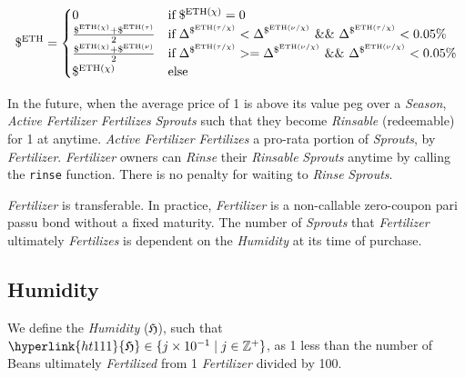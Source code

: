 \documentclass[tikz]{article}
\newcommand{\code}[1]{\texttt{#1}}
\newcommand{\term}[1]{\textsl{#1}}
\newcommand{\Bean}{} %
\begin{document}
    $$ 
        \$^{\text{ETH}} =
        \begin{cases}
            {0} 
                & \text{if} \; \$^{\text{ETH}(\chi)} = 0  \\
            
            {\frac{\$^{\text{ETH}(\chi)} + \$^{\text{ETH}(\tau)}}
                    {2}} 
                & \text{if} \; 
                    \Delta^{\$^{\text{ETH}(\tau \slash \chi)}} < \Delta^{\$^{\text{ETH}(\nu \slash \chi)}} \mkern6mu \&\& 
                    \mkern6mu \Delta^{\$^{\text{ETH}(\tau \slash \chi)}} < 0.05\% \\
            
            {\frac{\$^{\text{ETH}(\chi)} + \$^{\text{ETH}(\nu)}}
                    {2}} 
                & \text{if} \; 
                    \Delta^{\$^{\text{ETH}(\tau \slash \chi)}} >= \Delta^{\$^{\text{ETH}(\nu \slash \chi)}} \mkern6mu \&\& 
                    \mkern6mu \Delta^{\$^{\text{ETH}(\nu \slash \chi)}} < 0.05\% \\
            
            {\$^{\text{ETH}(\chi)}} 
                & \text{else}
        \end{cases} 
    $$

In the future, when the average price of \Bean1 is above its value peg over a \term{Season}, \term{Active} \term{Fertilizer} \term{Fertilizes} \term{Sprouts} such that they become \term{Rinsable} (redeemable) for \Bean1 at anytime. \term{Active} \term{Fertilizer} \term{Fertilizes} a pro-rata portion of \term{Sprouts}, by \term{Fertilizer}. \term{Fertilizer} owners can \term{Rinse} their \term{Rinsable} \term{Sprouts} anytime by calling the \code{rinse} function. There is no penalty for waiting to \term{Rinse} \term{Sprouts}.

\term{Fertilizer} is transferable. In practice, \term{Fertilizer} is a non-callable zero-coupon pari passu bond without a fixed maturity. The number of \term{Sprouts} that \term{Fertilizer} ultimately \term{Fertilizes} is dependent on the \term{Humidity} at its time of purchase.


\subsection{Humidity}

We define the \term{Humidity} (\hyperlink{ht111}{$\mathfrak{H}$}), such that $\hyperlink{ht111}{\mathfrak{H}} \in \{j \times 10^{-1} \mid j \in \mathbb{Z}^{+} \}$, as 1 less than the number of Beans ultimately \term{Fertilized} from 1 \term{Fertilizer} divided by 100. 
\end{document}
